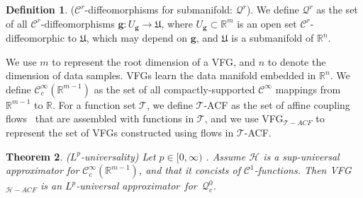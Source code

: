 \documentclass[sigconf, anonymous, review]{acmart}
\theoremstyle{plain}
\newtheorem{theorem}{Theorem}[section]
\theoremstyle{definition}
\newtheorem{definition}[theorem]{Definition}
\theoremstyle{remark}
\begin{document}
\begin{definition}
($\mathcal{C}^r$-diffeomorphisms for submanifold: $\mathcal{Q}^r$). We define $\mathcal{Q}^r$  as the set of all $\mathcal{C}^r$-diffeomorphisms $\mathbf{g}: U_\mathbf{g} \rightarrow \mathfrak{U} $, where $U_\mathbf{g} \subset \mathbb{R}^m$ is an open set $\mathcal{C}^r$-diffeomorphic to $\mathfrak{U}$, which may depend on $\mathbf{g}$, and $\mathfrak{U}$ is a submanifold of $\mathbb{R}^n$.
\end{definition}

We use $m$ to represent the root dimension of a VFG, and $n$ to denote the dimension of data samples. VFGs learn the data manifold embedded in $\mathbb{R}^n$. We define $\mathcal{C}_c^{\infty}(\mathbb{R}^{m-1})$ as the set of all compactly-supported $\mathcal{C}^{\infty}$ mappings from $\mathbb{R}^{m-1}$ to $\mathbb{R}$. For a function set $\mathcal{T}$, we define $\mathcal{T}$-ACF as the set of affine coupling flows~\cite{Takeshi2020} that  are assembled  with functions in $\mathcal{T}$, and  we use VFG$_{\mathcal{T}-ACF}$ to represent the set of VFGs constructed using flows in $\mathcal{T}$-ACF. 
\begin{theorem} \label{thm:lp_univ}
($L^p$-universality) Let $p \in [0, \infty)$ . Assume $\mathcal{H}$ is a sup-universal approximator for $\mathcal{C}_c^{\infty}(\mathbb{R}^{m-1})$, and that it concists of $\mathcal{C}^1$-functions. Then  VFG$_{\mathcal{H}-ACF}$ is an $L^p$-universal approximator~for~$\mathcal{Q}_c^0$. 
\end{theorem}
\end{document}
